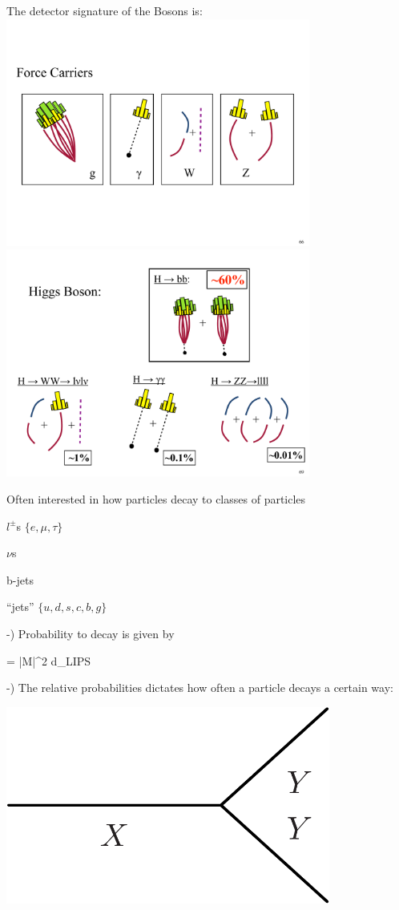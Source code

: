 {\clearpage
The detector signature of the Bosons is:
\bc
\includegraphics[width=0.75\textwidth]{./Bosons.pdf}
\ec
\bc
\includegraphics[width=0.75\textwidth]{./HiggsBoson.pdf}
\ec

\clearpage
Often interested in how particles decay to classes of particles 

\bi
\item[-] $l^\pm$s $\{e, \mu, \tau\}$
\item[-] $\nu$s
\item[-] b-jets
\item[-] ``jets''  $\{u,d,s,c,b,g\}$
\ei

-) Probability to decay is given by 

\be
\Gamma =  |M|^2 d\Pi_{LIPS}
\ee


\begin{minipage}{0.6\textwidth}
-) The relative probabilities dictates how often a particle decays a certain way: 
\end{minipage} \hfill
\begin{minipage}{0.3\textwidth}
\includegraphics[width=0.8\textwidth]{./XToYY.pdf}
\end{minipage} 

}

